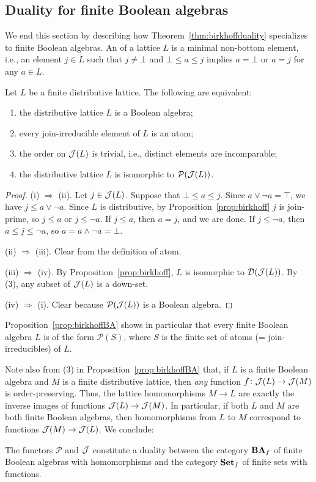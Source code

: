 \subsection*{Duality for finite Boolean algebras}
We end this section by describing how Theorem~\ref{thm:birkhoffduality} specializes to finite Boolean algebras.
An  of a lattice $L$ is a minimal non-bottom element, i.e., an element $j \in L$ such that $j \neq \bot$ and $\bot \leq a \leq j$ implies $a = \bot$ or $a = j$ for any $a \in L$.
\begin{proposition}\label{prop:birkhoffBA}
Let $L$ be a finite distributive lattice. The following are equivalent:
\begin{enumerate}
\item[(i)] the distributive lattice $L$ is a Boolean algebra;
\item[(ii)] every join-irreducible element of $L$ is an atom;
\item[(iii)] the order on $\mathcal{J}(L)$ is trivial, i.e., distinct elements are incomparable;
\item[(iv)] the distributive lattice $L$ is isomorphic to $\mathcal{P}(\mathcal{J}(L))$.
\end{enumerate}
\end{proposition}
\begin{proof}
(i) $\Rightarrow$ (ii). Let $j \in \mathcal{J}(L)$. Suppose that $\bot \leq a \leq j$. Since $a \vee \neg a = \top$, we have $j \leq a \vee \neg a$. Since $L$ is distributive, by Proposition~\ref{prop:birkhoff} $j$ is join-prime, so $j \leq a$ or $j \leq \neg a$. If $j \leq a$, then $a = j$, and we are done. If $j \leq \neg a$, then $a \leq j \leq \neg a$, so $a = a \wedge \neg a = \bot$.

(ii) $\Rightarrow$ (iii). Clear from the definition of atom.

(iii) $\Rightarrow$ (iv). By Proposition~\ref{prop:birkhoff}, $L$ is isomorphic to $\mathcal{D}(\mathcal{J}(L))$. By (3), any subset of $\mathcal{J}(L)$ is a down-set.

(iv) $\Rightarrow$ (i). Clear because $\mathcal{P}(\mathcal{J}(L))$ is a Boolean algebra.
\end{proof}
Proposition~\ref{prop:birkhoffBA} shows in particular that every finite Boolean algebra $L$ is of the form $\mathcal{P}(S)$, where $S$ is the finite set of atoms (= join-irreducibles) of $L$.

Note also from (3) in Proposition~\ref{prop:birkhoffBA} that, if $L$ is a finite Boolean algebra and $M$ is a finite distributive lattice, then \emph{any} function $f \colon \mathcal{J}(L) \to \mathcal{J}(M)$ is order-preserving. Thus, the lattice homomorphisms $M \to L$ are exactly the inverse images of functions $\mathcal{J}(L) \to \mathcal{J}(M)$. In particular, if both $L$ and $M$ are both finite Boolean algebras, then homomorphisms from $L$ to $M$ correspond to functions $\mathcal{J}(M) \to \mathcal{J}(L)$. We conclude:  
\begin{theorem}\label{thm:birkhoffdualityBA}
The functors $\mathcal{P}$ and $\mathcal{J}$ constitute a duality between the category $\mathbf{BA}_f$ of finite Boolean algebras with homomorphisms and the category $\mathbf{Set}_f$ of finite sets with functions.
\end{theorem}

